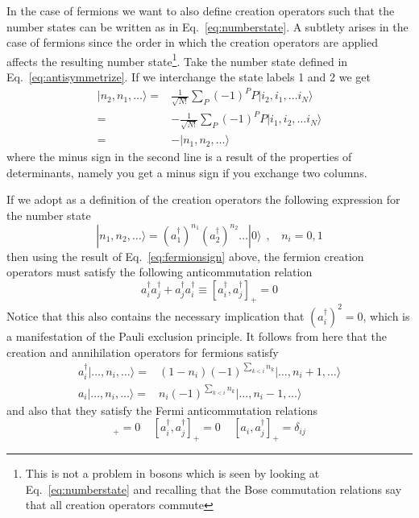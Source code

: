 \documentclass[11pt,letter]{article}
\begin{document}
In the case of fermions we want to also define creation  operators such that
the number states can be written as in Eq.~\ref{eq:numberstate}.    A subtlety
arises in the case of fermions since  the order in which the
creation operators are applied affects the resulting number state\footnote{This is
not a problem in bosons which is seen by looking at Eq.~\ref{eq:numberstate}
and recalling that the Bose commutation relations say that all creation
operators commute}.   Take the number state defined in Eq.~\ref{eq:antisymmetrize}.
If we interchange the state labels 1 and 2 we get 
\begin{equation}
\begin{split}
  | n_{2},  n_{1}, \ldots \rangle = &
  \frac{1}{\sqrt{N!}} \sum_{P} (- 1)^{P} P | i_{2},  i_{1}, \ldots i_{N} \rangle \\
   = & -
  \frac{1}{\sqrt{N!}} \sum_{P} (- 1)^{P} P | i_{1},  i_{2}, \ldots i_{N} \rangle \\ 
   = & -
  | n_{1},  n_{2}, \ldots \rangle 
\end{split}
\label{eq:fermionsign}
\end{equation} 
where the minus sign in the second line is a result of the properties of determinants, namely you get a minus sign if you exchange two columns. 

If we adopt as a definition of the creation operators the following expression for the number state 
\begin{equation}
  | n_{1}, n_{2}, \dots \rangle =  
   ( a_{1}^{\dagger} ) ^{n_{1}}  
   ( a_{2}^{\dagger} ) ^{n_{2}}  \ldots | 0 \rangle \ \ , \ \ \ \ n_{i}=0,1 
  \label{eq:numberstateFermions}
\end{equation}
then using the result of Eq.~\ref{eq:fermionsign} above, the fermion creation operators must satisfy the following anticommutation relation
\begin{equation}
 a_{i}^{\dagger}a_{j}^{\dagger} + a_{j}^{\dagger}a_{i}^{\dagger} \equiv [a_{i}^{\dagger}, a_{j}^{\dagger}]_{+} = 0 
\end{equation}
Notice that this also contains the necessary implication that $(a_{i}^{\dagger})^{2}=0$, which is a manifestation of the Pauli exclusion principle.  It follows from here that the creation and annihilation operators for fermions satisfy 
\begin{equation}
\begin{split}
  a_{i}^{\dagger}| \ldots, n_{i}, \ldots \rangle 
  =  & (1-n_{i})(-1)^{\sum_{k<i} n_{k}} | \ldots, n_{i}+1, \ldots \rangle \\
  a_{i}| \ldots, n_{i}, \ldots \rangle 
  =  & n_{i}(-1)^{\sum_{k<i} n_{k}} | \ldots, n_{i}-1, \ldots \rangle
\end{split} 
\end{equation}
and also that they satisfy the Fermi anticommutation relations 
\begin{equation}
  [a_{i}, a_{j}]_{+} = 0 \ \ \ \ \  [a_{i}^{\dagger}, a_{j}^{\dagger}]_{+} = 0 \ \ \ \ \   [a_{i},a_{j}^{\dagger}]_{+}=\delta_{ij}
\end{equation}
\end{document}
